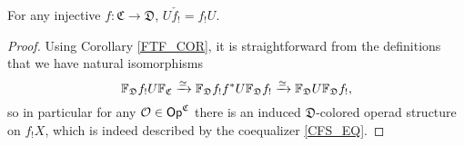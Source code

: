 \documentclass[a4paper,10pt
,draft
]{article}%
\renewcommand{\1}{\eta}%
\begin{document}
\begin{corollary}
      \label{FSU_COR}
      For any injective $f \colon \mathfrak C \to \mathfrak D$, $U \check{f_!} = f_! U$.
\end{corollary}
\begin{proof}
      Using Corollary \ref{FTF_COR}, it is straightforward from the definitions that we have natural isomorphisms
      \[
            \mathbb F_{\mathfrak D} f_! U \mathbb F_{\mathfrak C} \xrightarrow{\simeq} %
            \mathbb F_{\mathfrak D} f_! f^{\**} U \mathbb F_{\mathfrak D} f_! \xrightarrow{\simeq} %
            \mathbb F_{\mathfrak D} U \mathbb F_{\mathfrak D} f_!,
      \]
      so in particular for any $\mathcal{O} \in \mathsf{Op}^{\mathfrak C}$
      there is an induced $\mathfrak D$-colored operad structure on $f_! X$,
      which is indeed described by the coequalizer \eqref{CFS_EQ}.
\end{proof}
\end{document}
